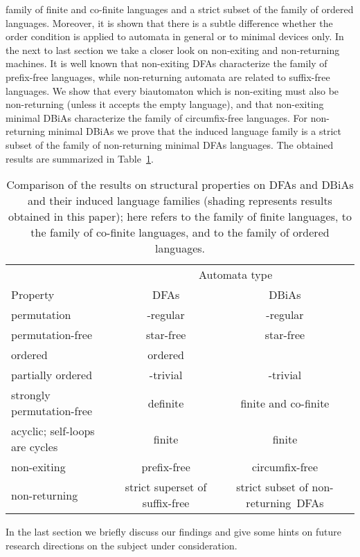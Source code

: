 \documentclass[submission]{eptcs}
\newcommand{\dfa}{\textrm{DFA}}
\newcommand{\dbia}{\textrm{DBiA}}
\begin{document}
family of finite and co-finite languages and a strict subset of the
family of ordered languages. Moreover, it is shown that there is a
subtle difference whether the order condition is applied to automata
in general or to minimal devices only. In the next to last section we
take a closer look on non-exiting and non-returning machines. It is
well known that non-exiting \dfa s characterize the family of
prefix-free languages, while non-returning automata are related to
suffix-free languages. We show that every biautomaton which is
non-exiting must also be non-returning (unless it accepts the empty
language), and that non-exiting minimal \dbia s characterize the
family of circumfix-free languages. For non-returning minimal \dbia s
we prove that the induced language family is a strict subset of the
family of non-returning minimal \dfa s languages. The obtained results
are summarized in Table~\ref{tab:results}.
\def\shade{\cellcolor[gray]{0.75}}\begin{table}
  \centering
  \begin{tabular}{|l||c|c|}\hline\hline
 & \multicolumn{2}{c|}{Automata type}\\\cline{2-3}
Property & \dfa  s & \dbia s \\\hline\hline
permutation & -regular & \shade -regular\\\hline
permutation-free & star-free & \shade star-free\\\hline 
ordered & ordered & \shade  \\\hline
partially ordered & -trivial & -trivial\\\hline 
strongly permutation-free & \shade definite & \shade finite and co-finite\\\hline
acyclic; self-loops are cycles & finite & \shade finite\\\hline
non-exiting & prefix-free & \shade circumfix-free\\\hline
non-returning & strict superset of suffix-free & \shade strict subset of \mbox{non-returning \dfa s} \\\hline\hline
  \end{tabular}
  \caption{Comparison of the results on structural properties on \dfa s and \dbia s and their induced language families (shading represents results obtained in this paper); here  refers to the family of finite languages,  to the family of co-finite languages, and  to the family of ordered languages.}
  \label{tab:results}
\end{table}
In the last section we briefly discuss our findings and give some
hints on future research directions on the subject under
consideration.
\end{document}
